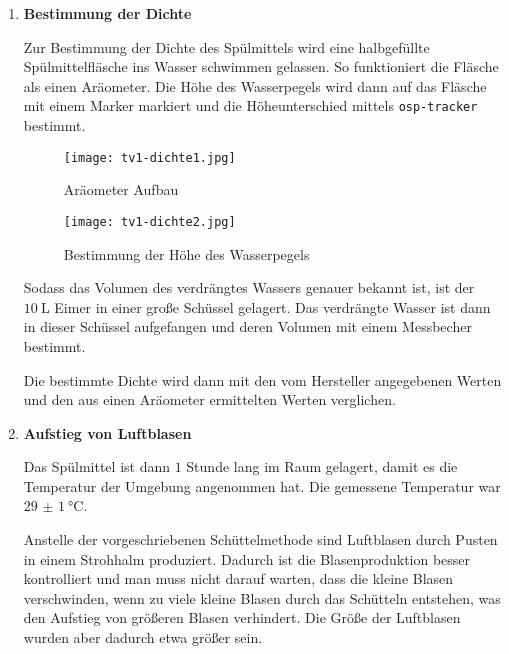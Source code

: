 		\begin{enumerate}
			\item \textbf{Bestimmung der Dichte}

				Zur Bestimmung der Dichte des Spülmittels wird eine halbgefüllte Spülmittelfläsche ins Wasser schwimmen gelassen. So funktioniert die Fläsche als einen Aräometer. Die Höhe des Wasserpegels wird dann auf das Fläsche mit einem Marker markiert und die Höheunterschied mittels \texttt{osp-tracker} bestimmt.
				\vspace{\baselineskip}
				\begin{multicols}{2}
					\begin{figure}[H]
						\centering
						\texttt{[image: tv1-dichte1.jpg]}
						\caption{\centering Aräometer Aufbau}
					\end{figure}
					\begin{figure}[H]
						\centering
						\texttt{[image: tv1-dichte2.jpg]}
						\caption{\centering Bestimmung der Höhe des Wasserpegels}
					\end{figure}
				\end{multicols}
				Sodass das Volumen des verdrängtes Wassers genauer bekannt ist, ist der $\SI{10}{\liter}$ Eimer in einer große Schüssel gelagert. Das verdrängte Wasser ist dann in dieser Schüssel aufgefangen und deren Volumen mit einem Messbecher bestimmt. 

				Die bestimmte Dichte wird dann mit den vom Hersteller angegebenen Werten und den aus einen Aräometer ermittelten Werten verglichen.
			\item \textbf{Aufstieg von Luftblasen}

				Das Spülmittel ist dann $1$ Stunde lang im Raum gelagert, damit es die Temperatur der Umgebung angenommen hat. Die gemessene Temperatur war $\SI{29(1)}{\celsius}$. 

				Anstelle der vorgeschriebenen Schüttelmethode sind Luftblasen durch Pusten in einem Strohhalm produziert. Dadurch ist die Blasenproduktion besser kontrolliert und man muss nicht darauf warten, dass die kleine Blasen verschwinden, wenn zu viele kleine Blasen durch das Schütteln entstehen, was den Aufstieg von größeren Blasen verhindert. Die Größe der Luftblasen wurden aber dadurch etwa größer sein.


\end{enumerate}
